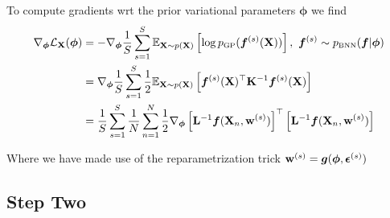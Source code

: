 \documentclass{article}
\begin{document}
To compute gradients wrt the prior variational parameters $\bm \phi$ we find
\begin{align}
    \nabla _{\bphi} \elbo _{\tiny \X} (\bm \phi ) 
    &= -\nabla _{\bphi} \frac{1}{S} \sum_{s=1}^S  \E_{\X \sim p(\B X)} \BB{\log \pgp (\bm f ^{(s)}(\X)) }, \ \bm f^{(s)} \sim \pbnn (\bm f |  \bm \phi )  \\
    &= \nabla _{\bphi} \frac{1}{S} \sum_{s=1}^S \half \E_{\X \sim p(\B X)} \BB{ \bm f ^{(s)}( \X  )^\top \B K ^{-1}\bm f ^{(s)}( \X ) } \\
    &=   \frac{1}{S} \sum_{s=1}^S \frac{1}{N} \sum_{n=1}^N \half \nabla _{\bphi}  \BB{ \B  L^{-1}\bm f ( \X_n, \B w ^{(s)}  ) }^\top\BB{ \B  L^{-1}\bm f ( \X_n, \B w ^{(s)}  ) } \\
\end{align}

Where we have made use of the reparametrization trick $ \mathbf{w}  ^{(s)}= \bm g(\bm \phi, \bm \epsilon^{(s)})$ 

\subsection{Step Two}
\end{document}
